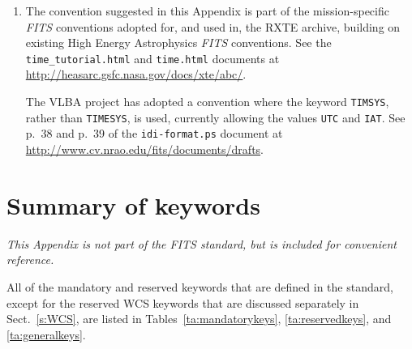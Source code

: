 \documentclass[onecolumn]{aa}
\begin{document}
\begin{enumerate}
\item The convention suggested in this Appendix is part of the mission-specific
   {\em FITS\/} conventions adopted for, and used in,
   the RXTE archive, building on
   existing High Energy Astrophysics {\em FITS\/} conventions.  See
   the {\tt time\_tutorial.html} and {\tt time.html} documents at
      \url{http://heasarc.gsfc.nasa.gov/docs/xte/abc/}.

   The VLBA project has adopted a convention where the 
   keyword {\tt TIMSYS}, rather than {\tt TIMESYS}, is used,
   currently allowing the values {\tt UTC} and {\tt IAT}.
   See p.~38 and p.~39 of the {\tt idi-format.ps} document at
       \url{http://www.cv.nrao.edu/fits/documents/drafts}.
\end{enumerate}

\onecolumn

\section{Summary of keywords}
   \label{s:summ} 
   {\em This Appendix is not part of the {\em FITS\/} standard, 
   but is included for convenient reference.}
   
   All of the mandatory and reserved keywords that are defined in the standard,
   except  for the reserved WCS keywords that are discussed separately in 
   Sect.\ \ref{s:WCS}, are listed in Tables~\ref{ta:mandatorykeys},  
   \ref{ta:reservedkeys}, and \ref{ta:generalkeys}.
\end{document}
